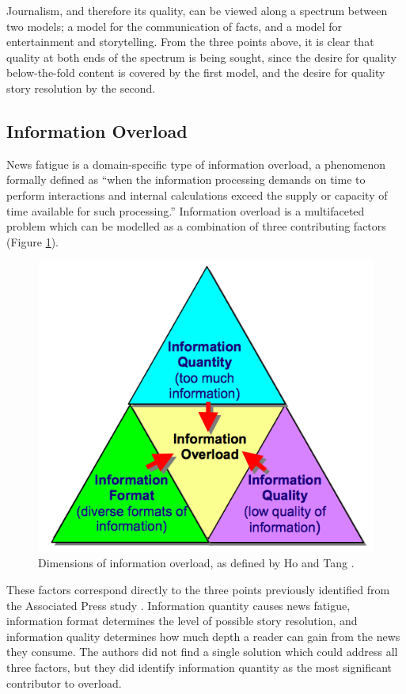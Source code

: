  Journalism, and therefore its quality, can be viewed along a spectrum between two models; a model for the communication of facts, and a model for entertainment and storytelling. From the three points above, it is clear that quality at both ends of the spectrum is being sought, since the desire for quality below-the-fold content is covered by the first model, and the desire for quality story resolution by the second.

\subsection{Information Overload}

News fatigue is a domain-specific type of information overload, a phenomenon formally defined as ``when the information processing demands on time to perform interactions and internal calculations exceed the supply or capacity of time available for such processing.'' \citep[p.206]{InformationOverloadATemporalApproach} Information overload is a multifaceted problem which can be modelled as a combination of three contributing factors (Figure \ref{fig:dimensions}).

\begin{figure}[htbp!]
	\centering
	\includegraphics[width=.55\textwidth]{img/lit-survey/overload-model.png}
	\caption{Dimensions of information overload, as defined by Ho and Tang \citep{TowardsAnOptimalResolutionToInformationOverload}.}
	\label{fig:dimensions}
\end{figure}

These factors correspond directly to the three points previously identified from the Associated Press study \citep{anewmodelfornews}. Information quantity causes news fatigue, information format determines the level of possible story resolution, and information quality determines how much depth a reader can gain from the news they consume. The authors did not find a single solution which could address all three factors, but they did identify information quantity as the most significant contributor to overload.

